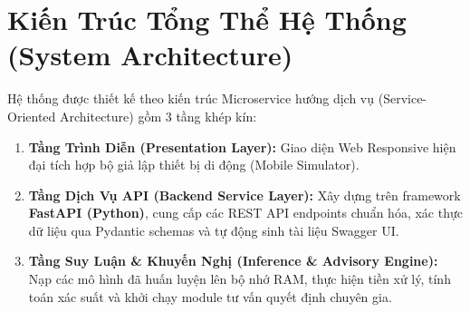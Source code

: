 \documentclass[12pt,a4paper]{report}
\begin{document}
\section{Kiến Trúc Tổng Thể Hệ Thống (System Architecture)}
Hệ thống được thiết kế theo kiến trúc Microservice hướng dịch vụ (Service-Oriented Architecture) gồm 3 tầng khép kín:
\begin{enumerate}
    \item \textbf{Tầng Trình Diễn (Presentation Layer):} Giao diện Web Responsive hiện đại tích hợp bộ giả lập thiết bị di động (Mobile Simulator).
    \item \textbf{Tầng Dịch Vụ API (Backend Service Layer):} Xây dựng trên framework \textbf{FastAPI (Python)}, cung cấp các REST API endpoints chuẩn hóa, xác thực dữ liệu qua Pydantic schemas và tự động sinh tài liệu Swagger UI.
    \item \textbf{Tầng Suy Luận \& Khuyến Nghị (Inference \& Advisory Engine):} Nạp các mô hình đã huấn luyện lên bộ nhớ RAM, thực hiện tiền xử lý, tính toán xác suất và khởi chạy module tư vấn quyết định chuyên gia.
\end{enumerate}
\end{document}
